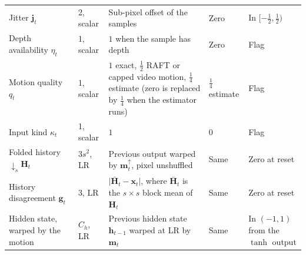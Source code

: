 {\begin{longtable}{@{}p{}p{}p{}p{}p{}@{}}
Jitter $\mathbf{j}_t$ & 2, scalar & Sub-pixel offset of the samples & Zero & In $[-\tfrac12,\tfrac12)$ \\
Depth availability $\eta_t$ & 1, scalar & $1$ when the sample has depth & Zero & Flag \\
Motion quality $q_t$ & 1, scalar & $1$ exact, $\tfrac12$ RAFT or capped video motion, $\tfrac14$ estimate (zero is replaced by $\tfrac14$ when the estimator runs) & $\tfrac14$ estimate & Flag \\
Input kind $\kappa_t$ & 1, scalar & $1$ & $0$ & Flag \\
Folded history $\downarrow_s\mathbf{H}_t$ & $3s^2$, LR & Previous output warped by $\mathbf{m}_t^{\uparrow}$, pixel unshuffled & Same & Zero at reset \\
History disagreement $\mathbf{g}_t$ & 3, LR & $\lvert\bar{\mathbf{H}}_t-\mathbf{x}_t\rvert$, where $\bar{\mathbf{H}}_t$ is the $s\times s$ block mean of $\mathbf{H}_t$ & Same & Zero at reset \\
Hidden state, warped by the motion & $C_h$, LR & Previous hidden state $\mathbf{h}_{t-1}$ warped at LR by $\mathbf{m}_t$ & Same & In $(-1,1)$ from the $\tanh$ output \\
\end{longtable}}

